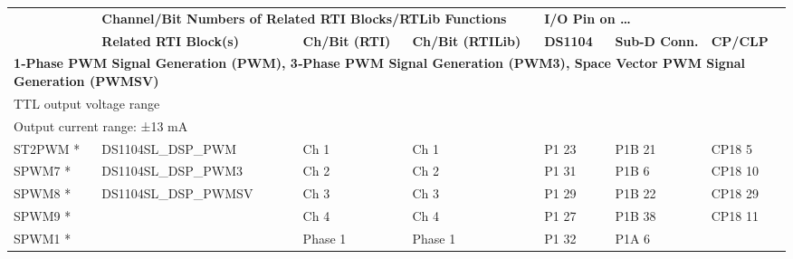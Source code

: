 \begin{table}[H]
\begin{adjustbox}{width=1\textwidth}
\small
\begin{tabular}{|lllllll|}
\hline
\rowcolor[HTML]{34CDF9} 
\multicolumn{1}{|l|}{\cellcolor[HTML]{34CDF9}\textbf{Signal}} &
  \multicolumn{3}{l|}{\cellcolor[HTML]{34CDF9}\textbf{Channel/Bit Numbers of Related RTI Blocks/RTLib Functions}} &
  \multicolumn{3}{l|}{\cellcolor[HTML]{34CDF9}\textbf{I/O Pin on …}} \\ \cline{5-7} 
\rowcolor[HTML]{34CDF9} 
\multicolumn{1}{|l|}{\cellcolor[HTML]{34CDF9}\textbf{}} &
  \multicolumn{1}{l|}{\cellcolor[HTML]{34CDF9}\textbf{Related RTI Block(s)}} &
  \multicolumn{1}{l|}{\cellcolor[HTML]{34CDF9}\textbf{Ch/Bit (RTI)}} &
  \multicolumn{1}{l|}{\cellcolor[HTML]{34CDF9}\textbf{Ch/Bit (RTILib)}} &
  \multicolumn{1}{l|}{\cellcolor[HTML]{34CDF9}\textbf{DS1104}} &
  \multicolumn{1}{l|}{\cellcolor[HTML]{34CDF9}\textbf{Sub-D Conn.}} &
  \textbf{CP/CLP} \\ \hline
\multicolumn{7}{|l|}{\textbf{1‑Phase PWM Signal Generation (PWM), 3‑Phase PWM Signal Generation (PWM3), Space Vector PWM Signal Generation (PWMSV)}} \\ \hline
\multicolumn{7}{|l|}{TTL output voltage range} \\
\multicolumn{7}{|l|}{Output current range: ±13 mA} \\
\multicolumn{1}{|l|}{ST2PWM *} &
  \multicolumn{1}{l|}{DS1104SL\_DSP\_PWM} &
  \multicolumn{1}{l|}{Ch 1} &
  \multicolumn{1}{l|}{Ch 1} &
  \multicolumn{1}{l|}{P1 23} &
  \multicolumn{1}{l|}{P1B 21} &
  CP18 5 \\
\multicolumn{1}{|l|}{SPWM7 *} &
  \multicolumn{1}{l|}{DS1104SL\_DSP\_PWM3} &
  \multicolumn{1}{l|}{Ch 2} &
  \multicolumn{1}{l|}{Ch 2} &
  \multicolumn{1}{l|}{P1 31} &
  \multicolumn{1}{l|}{P1B 6} &
  CP18 10 \\
\multicolumn{1}{|l|}{SPWM8 *} &
  \multicolumn{1}{l|}{DS1104SL\_DSP\_PWMSV} &
  \multicolumn{1}{l|}{Ch 3} &
  \multicolumn{1}{l|}{Ch 3} &
  \multicolumn{1}{l|}{P1 29} &
  \multicolumn{1}{l|}{P1B 22} &
  CP18 29 \\
\multicolumn{1}{|l|}{SPWM9 *} &
  \multicolumn{1}{l|}{} &
  \multicolumn{1}{l|}{Ch 4} &
  \multicolumn{1}{l|}{Ch 4} &
  \multicolumn{1}{l|}{P1 27} &
  \multicolumn{1}{l|}{P1B 38} &
  CP18 11 \\
\multicolumn{1}{|l|}{SPWM1 *} &
  \multicolumn{1}{l|}{} &
  \multicolumn{1}{l|}{Phase 1} &
  \multicolumn{1}{l|}{Phase 1} &
  \multicolumn{1}{l|}{P1 32} &
  \multicolumn{1}{l|}{P1A 6} &

\end{tabular}
\end{adjustbox}
\end{table}
